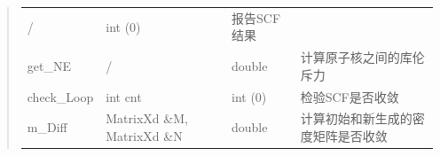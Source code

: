 \documentclass[11pt]{article}
\begin{document}
\begin{quote}
\begin{longtable}[]{@{}llll@{}}
\begin{minipage}[t]{0.14\columnwidth}
/\strut
\end{minipage} & \begin{minipage}[t]{0.09\columnwidth}\raggedright\strut
int (0)\strut
\end{minipage} & \begin{minipage}[t]{0.51\columnwidth}\raggedright\strut
报告SCF结果\strut
\end{minipage}\tabularnewline
\begin{minipage}[t]{0.15\columnwidth}\raggedright\strut
get\_NE\strut
\end{minipage} & \begin{minipage}[t]{0.14\columnwidth}\raggedright\strut
/\strut
\end{minipage} & \begin{minipage}[t]{0.09\columnwidth}\raggedright\strut
double\strut
\end{minipage} & \begin{minipage}[t]{0.51\columnwidth}\raggedright\strut
计算原子核之间的库伦斥力\strut
\end{minipage}\tabularnewline
\begin{minipage}[t]{0.15\columnwidth}\raggedright\strut
check\_Loop\strut
\end{minipage} & \begin{minipage}[t]{0.14\columnwidth}\raggedright\strut
int cnt\strut
\end{minipage} & \begin{minipage}[t]{0.09\columnwidth}\raggedright\strut
int (0)\strut
\end{minipage} & \begin{minipage}[t]{0.51\columnwidth}\raggedright\strut
检验SCF是否收敛\strut
\end{minipage}\tabularnewline
\begin{minipage}[t]{0.15\columnwidth}\raggedright\strut
m\_Diff\strut
\end{minipage} & \begin{minipage}[t]{0.14\columnwidth}\raggedright\strut
MatrixXd \&M, MatrixXd \&N\strut
\end{minipage} & \begin{minipage}[t]{0.09\columnwidth}\raggedright\strut
double\strut
\end{minipage} & \begin{minipage}[t]{0.51\columnwidth}\raggedright\strut
计算初始和新生成的密度矩阵是否收敛\strut
\end{minipage}\tabularnewline
\bottomrule
\end{longtable}
\end{quote}
\end{document}
